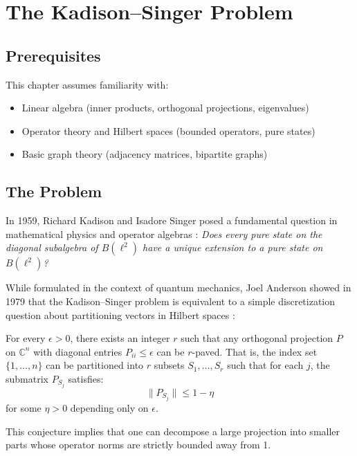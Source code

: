 \let\LocalMacro\relax

\chapter{The Kadison--Singer Problem}

\section{Prerequisites}
This chapter assumes familiarity with:
\begin{itemize}
\item Linear algebra (inner products, orthogonal projections, eigenvalues)
\item Operator theory and Hilbert spaces (bounded operators, pure states)
\item Basic graph theory (adjacency matrices, bipartite graphs)
\end{itemize}

\section{The Problem}
In 1959, Richard Kadison and Isadore Singer posed a fundamental question in mathematical physics and operator algebras \cite{kadison1959}: \emph{Does every pure state on the diagonal subalgebra of $B(\ell^2)$ have a unique extension to a pure state on $B(\ell^2)$?}

While formulated in the context of quantum mechanics, Joel Anderson showed in 1979 that the Kadison--Singer problem is equivalent to a simple discretization question about partitioning vectors in Hilbert spaces \cite{anderson1979}:

\begin{conjecture}
For every $\epsilon > 0$, there exists an integer $r$ such that any orthogonal projection $P$ on $\mathbb{C}^n$ with diagonal entries $P_{ii} \leq \epsilon$ can be $r$-paved. That is, the index set $\{1, \ldots, n\}$ can be partitioned into $r$ subsets $S_1, \ldots, S_r$ such that for each $j$, the submatrix $P_{S_j}$ satisfies:
\begin{equation}
\|P_{S_j}\| \leq 1 - \eta
\end{equation}
for some $\eta > 0$ depending only on $\epsilon$.
\end{conjecture}

This conjecture implies that one can decompose a large projection into smaller parts whose operator norms are strictly bounded away from 1.

